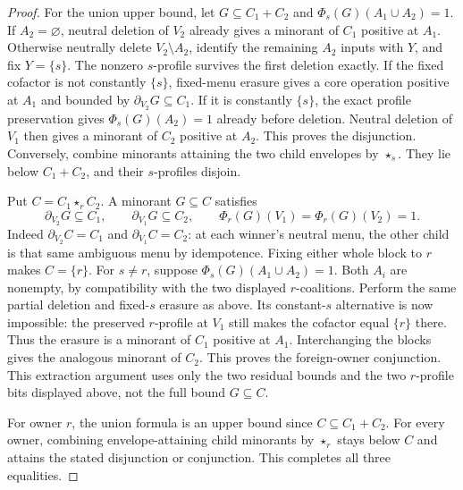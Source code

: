 \begin{proof}
For the union upper bound, let $G\subseteq C_1+C_2$ and
$\Phi_s(G)(A_1\cup A_2)=1$. If $A_2=\varnothing$, neutral deletion
of $V_2$ already gives a minorant of $C_1$ positive at $A_1$.
Otherwise neutrally delete $V_2\setminus A_2$, identify the remaining
$A_2$ inputs with $Y$, and fix $Y=\{s\}$. The nonzero $s$-profile
survives the first deletion exactly. If the fixed cofactor is not
constantly $\{s\}$, fixed-menu erasure gives a core operation positive
at $A_1$ and bounded by
$\partial_{V_2}G\subseteq C_1$.
If it is constantly $\{s\}$, the exact profile preservation gives
$\Phi_s(G)(A_2)=1$ already before deletion. Neutral deletion of $V_1$
then gives a minorant of $C_2$ positive at $A_2$.
This proves the disjunction. Conversely, combine minorants attaining
the two child envelopes by $\star_s$. They lie below $C_1+C_2$, and
their $s$-profiles disjoin.

Put $C=C_1\star_r C_2$. A minorant $G\subseteq C$ satisfies
\[
 \partial_{V_2}G\subseteq C_1,\qquad
 \partial_{V_1}G\subseteq C_2,\qquad
 \Phi_r(G)(V_1)=\Phi_r(G)(V_2)=1.
\]
Indeed $\partial_{V_2}C=C_1$ and $\partial_{V_1}C=C_2$:
at each winner's neutral menu, the other child is that same ambiguous
menu by idempotence. Fixing either whole block to $r$ makes $C=\{r\}$.
For $s\ne r$, suppose $\Phi_s(G)(A_1\cup A_2)=1$.
Both $A_i$ are nonempty, by compatibility with the two displayed
$r$-coalitions. Perform the same partial deletion and fixed-$s$
erasure as above. Its constant-$s$ alternative is now impossible:
the preserved $r$-profile at $V_1$ still makes the cofactor equal
$\{r\}$ there. Thus the erasure is a minorant of $C_1$ positive
at $A_1$. Interchanging the blocks gives the analogous minorant of
$C_2$. This proves the foreign-owner conjunction.
This extraction argument uses only the two residual bounds and the
two $r$-profile bits displayed above, not the full bound $G\subseteq C$.

For owner $r$, the union formula is an upper bound since
$C\subseteq C_1+C_2$. For every owner, combining envelope-attaining
child minorants by $\star_r$ stays below $C$ and attains the stated
disjunction or conjunction. This completes all three equalities.
\end{proof}

